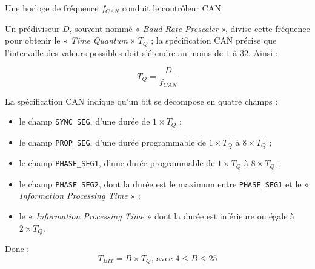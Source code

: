 


\thispagestyle{empty}


Une horloge de fréquence $f_{CAN}$ conduit le contrôleur CAN.

Un prédiviseur $D$, souvent nommé « \emph{Baud Rate Prescaler} », divise cette fréquence pour obtenir le « \emph{Time Quantum} » $T_Q$ ; la spécification CAN précise que l'intervalle des valeurs possibles doit s'étendre au moins de $1$ à $32$. Ainsi :

\begin{equation*}
  T_Q = \frac{D}{f_{CAN}}
\end{equation*}

La spécification CAN\cite{canSpecifBosch} indique qu'un bit se décompose en quatre champs :
\begin{itemize}
  \item le champ \texttt{SYNC\_SEG}, d'une durée de $1\times T_Q$ ;
  \item le champ \texttt{PROP\_SEG}, d'une durée programmable de $1\times T_Q$ à $8\times T_Q$ ;
  \item le champ \texttt{PHASE\_SEG1}, d'une durée programmable de $1\times T_Q$ à $8\times T_Q$ ;
  \item le champ \texttt{PHASE\_SEG2}, dont la durée est le maximum entre \texttt{PHASE\_SEG1} et le « \emph{Information Processing Time} » ;
  \item le « \emph{Information Processing Time} » dont la durée est inférieure ou égale à $2\times T_Q$.
\end{itemize}

Donc :
\begin{equation*}
  T_{BIT} = B \times T_Q\text{, avec~} 4 \leqslant B \leqslant 25
\end{equation*}




